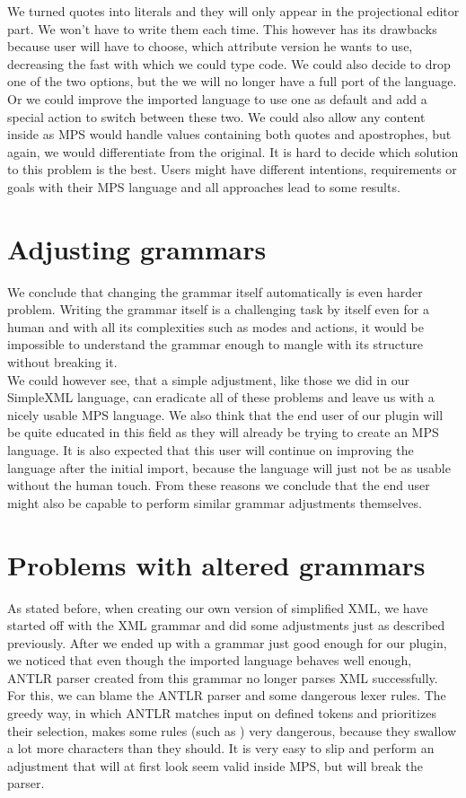 We turned quotes into literals and they will only appear in the projectional editor part. We won't have to write them each time. This however has its drawbacks because user will have to choose, which attribute version he wants to use, decreasing the fast with which we could type code. We could also decide to drop one of the two options, but the we will no longer have a full port of the language. Or we could improve the imported language to use one as default and add a special action to switch between these two. We could also allow any content inside as MPS would handle values containing both quotes and apostrophes, but again, we would differentiate from the original. It is hard to decide which solution to this problem is the best. Users might have different intentions, requirements or goals with their MPS language and all approaches lead to some results.

\section{Adjusting grammars}
We conclude that changing the grammar itself automatically is even harder problem. Writing the grammar itself is a challenging task by itself even for a human and with all its complexities such as modes and actions, it would be impossible to understand the grammar enough to mangle with its structure without breaking it.
\\

We could however see, that a simple adjustment, like those we did in our SimpleXML language, can eradicate all of these problems and leave us with a nicely usable MPS language. We also think that the end user of our plugin will be quite educated in this field as they will already be trying to create an MPS language. It is also expected that this user will continue on improving the language after the initial import, because the language will just not be as usable without the human touch. From these reasons we conclude that  the end user might also be capable to perform similar grammar adjustments themselves.

\section{Problems with altered grammars}
As stated before, when creating our own version of simplified XML, we have started off with the XML grammar and did some adjustments just as described previously. After we ended up with a grammar just good enough for our plugin, we noticed that even though the imported language behaves well enough, ANTLR parser created from this grammar no longer parses XML successfully. For this, we can blame the ANTLR parser and some dangerous lexer rules. The greedy way, in which ANTLR matches input on defined tokens and prioritizes their selection, makes some rules (such as ) very dangerous, because they swallow a lot more characters than they should. It is very easy to slip and perform an adjustment that will at first look seem valid inside MPS, but will break the parser.
\\

